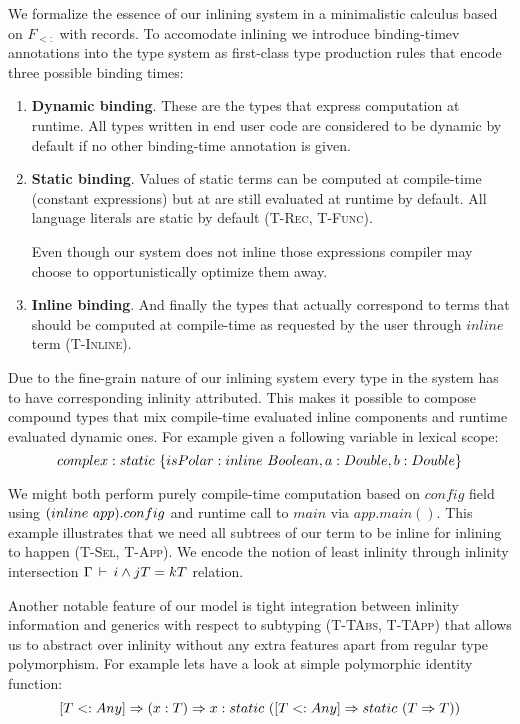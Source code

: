 We formalize the essence of our inlining system in a minimalistic calculus based 
on $F_{<:}$ with records. To accomodate inlining we introduce binding-timev annotations 
into the type system as first-class type production rules that encode three possible 
binding times:

\begin{enumerate}
  \item \textbf{Dynamic binding}. These are the types that express computation at runtime.
        All types written in end user code are considered to be dynamic by default if
        no other binding-time annotation is given.

  \item \textbf{Static binding}. Values of static terms can be computed at compile-time
        (\eg constant expressions) but at are still evaluated at runtime by default.
        All language literals are static by default (\textsc{T-Rec}, \textsc{T-Func}).

        Even though our system does not inline those expressions compiler may 
        choose to opportunistically optimize them away. 

  \item \textbf{Inline binding}. And finally the types that actually correspond to terms that
        should be computed at compile-time as requested by the user through $inline$ term
        (\textsc{T-Inline}). 
\end{enumerate}

Due to the fine-grain nature of our inlining system every type in the system has to 
have corresponding inlinity attributed. This makes it possible to compose compound
types that mix compile-time evaluated inline components and runtime evaluated dynamic
ones. For example given a following variable in lexical scope:  
\begin{equation}\nonumber
    complex: static\ \{ isPolar: inline\ Boolean, a: Double, b: Double \} 
\end{equation}

We might both perform purely compile-time computation based on $config$ field 
using $(inline\ app).config$ and runtime call to $main$ via $app.main()$. This example 
illustrates that we need all subtrees of our term to be inline for inlining to happen 
(\textsc{T-Sel}, \textsc{T-App}). We encode the notion of least inlinity through inlinity
intersection $\Gamma \,\vdash\, i \wedge j T = k T$ relation.

Another notable feature of our model is tight integration between inlinity information and
generics with respect to subtyping (\textsc{T-TAbs}, \textsc{T-TApp}) that allows us to
abstract over inlinity without any extra features apart from regular type polymorphism.
For example lets have a look at simple polymorphic identity function:
\begin{equation}\nonumber
    [T <: Any] \Rightarrow (x: T) \Rightarrow x: static\ ([T <: Any] \Rightarrow static\ (T \Rightarrow T))
\end{equation}

